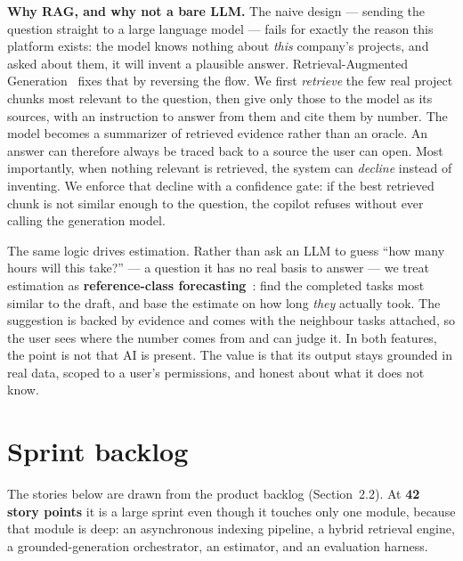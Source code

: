 \textbf{Why RAG, and why not a bare LLM.} The naive design --- sending the question straight to a large language
model --- fails for exactly the reason this platform exists: the model knows nothing about \emph{this} company's
projects, and asked about them, it will invent a plausible answer. Retrieval-Augmented
Generation~\cite{lewis2020rag} fixes that by reversing the flow. We first \emph{retrieve} the few real project
chunks most relevant to the question, then give only those to the model as its sources, with an instruction to
answer from them and cite them by number. The model becomes a summarizer of retrieved evidence rather than an
oracle. An answer can therefore always be traced back to a source the user can open. Most importantly, when
nothing relevant is retrieved, the system can \emph{decline} instead of inventing. We enforce that decline with
a confidence gate: if the best retrieved chunk is not similar enough to the question, the copilot refuses
without ever calling the generation model.

The same logic drives estimation. Rather than ask an LLM to guess ``how many hours will this
take?'' --- a question it has no real basis to answer --- we treat estimation as \textbf{reference-class
forecasting}~\cite{kahneman1977reference}: find the completed tasks most similar to the draft, and base the estimate on how long \emph{they}
actually took. The suggestion is backed by evidence and comes with the neighbour tasks attached, so the user
sees where the number comes from and can judge it. In both features, the point is not that AI is
present. The value is that its output stays grounded in real data, scoped to a user's permissions, and honest
about what it does not know.

\section{Sprint backlog}

The stories below are drawn from the product backlog (Section~2.2). At \textbf{42 story points} it is a large
sprint even though it touches only one module, because that module is deep: an asynchronous indexing pipeline,
a hybrid retrieval engine, a grounded-generation orchestrator, an estimator, and an evaluation harness.

